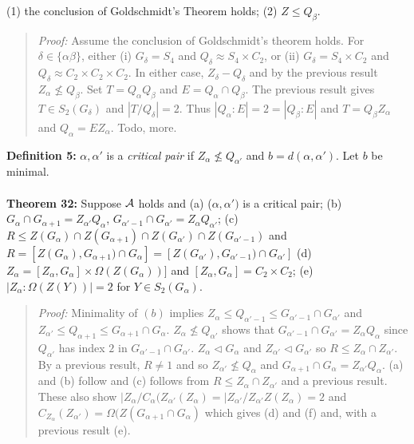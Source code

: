 (1) the conclusion of Goldschmidt's Theorem holds; (2) $Z \leq Q_{\beta}$.
\begin{quote}
\emph{Proof:}  Assume the conclusion of Goldschmidt's theorem holds.  For $\delta \in \{ \alpha \beta \}$,
either (i) $G_{\delta} = S_4$ and $Q_{\delta} \approx S_4 \times C_2$, or (ii) $G_{\delta} = S_4 \times C_2$ and $Q_{\delta} \approx C_2 \times C_2 \times C_2$.  In either
case, $Z_{\delta} - Q_{\delta}$ and by the previous result $Z_{\alpha} \nleq Q_{\beta}$.
Set $T= Q_{\alpha} Q_{\beta}$ and $E= Q_{\alpha} \cap Q_{\beta}$.  The previous result gives
$T \in S_2(G_{\delta})$ and $|T/Q_{\delta}|=2$.  Thus $ |Q_{\alpha}:E|=2= |Q_{\beta}:E| $ and
$T= Q_{\beta}Z_{\alpha}$ and
$Q_{\alpha}= E Z_{\alpha}$.
Todo, more.
\end{quote}
{\bf Definition 5:} $\alpha, \alpha'$ is a \emph{critical pair} if $Z_{\alpha} \nleq Q_{\alpha'}$ and
$b=d(\alpha, \alpha')$.  Let $b$ be minimal.
\\
\\
{\bf Theorem 32:}
Suppose ${\cal A}$ holds and (a) ($\alpha, \alpha')$ is a critical pair;
(b) $G_{\alpha} \cap G_{\alpha+1} = Z_{\alpha'}Q_{\alpha}$, $G_{\alpha'-1} \cap G_{\alpha'} = Z_{\alpha}Q_{\alpha'}$;
(c) $R \leq Z(G_{\alpha}) \cap Z(G_{\alpha+1}) \cap Z(G_{\alpha'}) \cap Z(G_{\alpha'-1})$ and
$R = [Z(G_{\alpha}), G_{\alpha+1}) \cap G_{\alpha}]= [Z(G_{\alpha'}), G_{\alpha'-1}) \cap G_{\alpha'}] $
(d) $ Z_{\alpha} = [ Z_{\alpha} , G_{\alpha} ] \times \Omega( Z(G_{\alpha} ))] $ and
$[ Z_{\alpha} , G_{\alpha} ] = C_2 \times C_2$;
(e) $|Z_{\alpha}:\Omega(Z(Y))|=2$ for $Y \in S_2(G_{\alpha})$.
\begin{quote}
\emph{Proof:}  Minimality of $(b)$ implies $Z_{\alpha} \leq Q_{\alpha'-1} \leq G_{\alpha'-1} \cap G_{\alpha'} $ and
$Z_{\alpha'} \leq Q_{\alpha+1} \leq G_{\alpha+1} \cap G_{\alpha} $.
$Z_{\alpha} \nleq Q_{\alpha'}$ shows that
$G_{\alpha'-1} \cap G_{\alpha'} = Z_{\alpha} Q_{\alpha} $ since $Q_{\alpha'}$ has index $2$ in
$G_{\alpha'-1} \cap G_{\alpha'}$.
$Z_{\alpha} \lhd G_{\alpha}$ and
$Z_{\alpha'} \lhd G_{\alpha'}$  so
$R \leq Z_{\alpha} \cap Z_{\alpha'} $.  By a previous result, $R \neq 1$ and so $Z_{\alpha'} \nleq Q_{\alpha}$
and $G_{\alpha+1} \cap G_{\alpha}= Z_{\alpha'} Q_{\alpha}$.  (a) and (b) follow and (c) follows from
$R \leq Z_{\alpha} \cap Z_{\alpha'} $ and a previous result.   These also show
$ |Z_{\alpha} / C_{\alpha}(Z_{\alpha'}(Z_{\alpha})= |Z_{\alpha'} / Z_{\alpha'}Z(Z_{\alpha}) =2 $
and
$C_{Z_{\alpha}}(Z_{\alpha'})= \Omega( Z(
G_{\alpha+1} \cap G_{\alpha}
)$ which gives (d) and (f) and, with a previous result (e).
\end{quote}
